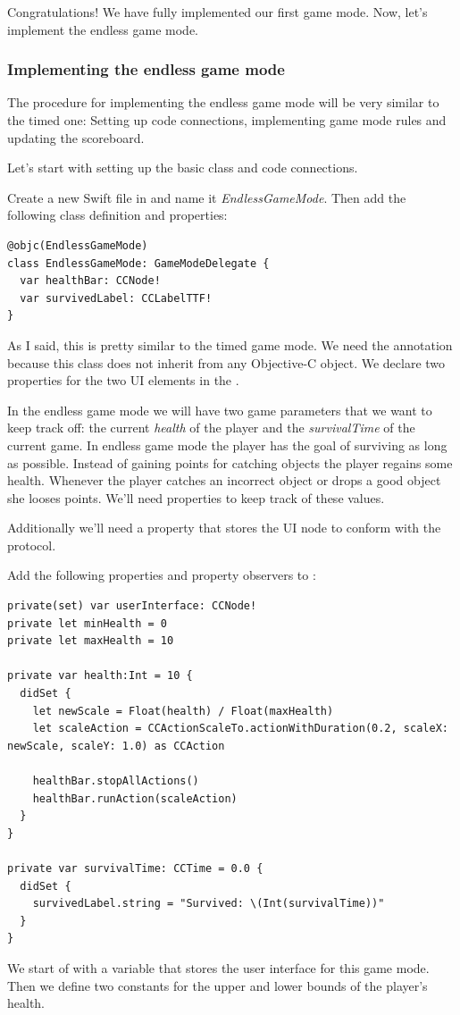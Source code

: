 Congratulations! We have fully implemented our first game mode. Now, let's
implement the endless game mode.

\subsubsection{Implementing the endless game mode}
The procedure for implementing the endless game mode will be very similar to the
timed one: Setting up code connections, implementing game mode rules and
updating the scoreboard.

Let's start with setting up the basic class and code connections.
\begin{leftbar}
Create a new Swift file in \xcode{} and name it \textit{EndlessGameMode}. Then
add the following class definition and properties:
\begin{lstlisting}
@objc(EndlessGameMode)
class EndlessGameMode: GameModeDelegate {
  var healthBar: CCNode!
  var survivedLabel: CCLabelTTF!
}
\end{lstlisting}
\end{leftbar}
As I said, this is pretty similar to the timed game mode. We need the
 annotation because this class does not inherit from any
Objective-C object. We declare two properties for the two UI elements in the
 \ccbfile{}.

In the endless game mode we will have two game parameters that we want to keep
track off: the current \textit{health} of the player and the
\textit{survivalTime} of the current game. In endless game mode the player has
the goal of surviving as long as possible. Instead of gaining points for
catching objects the player regains some health. Whenever the player catches an
incorrect object or drops a good object she looses points. We'll need properties
to keep track of these values.

Additionally we'll need a property that stores the UI node to conform with the
 protocol.

\begin{leftbar}
Add the following properties and property observers to
:
\begin{lstlisting}
private(set) var userInterface: CCNode!
private let minHealth = 0
private let maxHealth = 10

private var health:Int = 10 {
  didSet {
    let newScale = Float(health) / Float(maxHealth)
    let scaleAction = CCActionScaleTo.actionWithDuration(0.2, scaleX: newScale, scaleY: 1.0) as CCAction
    
    healthBar.stopAllActions()
    healthBar.runAction(scaleAction)
  }
}

private var survivalTime: CCTime = 0.0 {
  didSet {
    survivedLabel.string = "Survived: \(Int(survivalTime))"
  }
}
\end{lstlisting}
\end{leftbar}
We start of with a variable that stores the user
interface for this game mode. Then we define two constants for the upper and
lower bounds of the player's health. 

